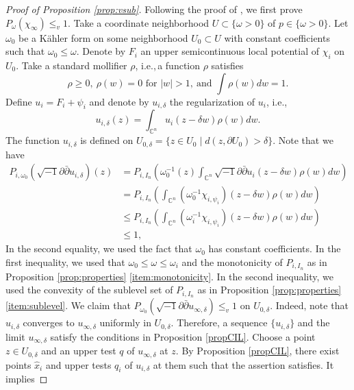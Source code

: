 \documentclass{amsart}
\numberwithin{equation}{section}
\theoremstyle{plain}
\theoremstyle{definition}
\theoremstyle{remark}
\newcommand{\delb}{\sqrt{-1}\partial\bar{\partial}}
\begin{document}
\begin{proof}[Proof of Proposition \ref{prop:vsub}]
    Following the proof of \cite[Proposition 21]{CS17}, we first prove $P_\omega(\chi_\infty)\le_v1$.
    Take a coordinate neighborhood $U\subset\{\omega>0\}$ of $p\in\{\omega>0\}$. Let $\omega_0$ be a K{\"a}hler form on some neighborhood $U_0 \subset U$ with constant coefficients such that $\omega_0 \le \omega$. Denote by $F_i$ an upper semicontinuous local potential of $\chi_i$ on $U_0$. Take a standard mollifier $\rho$, i.e.,\,a function $\rho$ satisfies $$\rho\ge0, \ \rho(w)=0 \text{ for $|w|>1$},\ \text{and } \int\rho(w)dw=1.$$ Define $u_{i}=F_i+\psi_i$ and denote by $u_{i,\delta}$ the regularization of $u_i$, i.e.,
    \begin{equation*}
        u_{i,\delta}(z)=\int_{\mathbb{C}^n} u_i(z-\delta w)\rho(w)dw.
    \end{equation*}
    The function $u_{i,\delta}$ is defined on $U_{0,\delta} =\{z\in U_0\mid d(z,\partial U_0)> \delta \}.$
    Note that we have
    \begin{equation*}
        \begin{split}
        P_{i,\omega_0}(\delb u_{i,\delta})(z)
        &=P_{i,I_n}\left(\omega^{-1}_0(z) \int_{\mathbb{C}^n}\delb u_i(z-\delta w)\rho(w)dw
        \right)\\
        &=P_{i,I_n}\left( \int_{\mathbb{C}^n}(\omega^{-1}_0 \chi_{i,\psi_i})(z-\delta w)\rho(w)dw
        \right)\\
        &\le P_{i,I_n}\left( \int_{\mathbb{C}^n}(\omega^{-1}_i \chi_{i,\psi_i})(z-\delta w)\rho(w)dw
        \right)\\
        &\le 1,
        \end{split}
    \end{equation*}
    In the second equality, we used the fact that $\omega_0$ has constant coefficients. In the first inequality, we used that $\omega_0\le \omega\le\omega_i$ and the monotonicity of $P_{i,I_n}$ as in Proposition \ref{prop:properties} \ref{item:monotonicity}. In the second inequality, we used the convexity of the sublevel set of $P_{i,I_n}$ as in Proposition \ref{prop:properties} \ref{item:sublevel}. We claim that $P_{\omega_0}(\delb u_{\infty,\delta})\le_v 1$ on $U_{0,\delta}$.
    Indeed, note that $u_{i,\delta}$ converges to $u_{\infty,\delta}$ uniformly in $U_{0,\delta}$. Therefore, a sequence $\{ u_{i,\delta}\}$ and the limit $u_{\infty,\delta}$ satisfy the conditions in Proposition \ref{propCIL}. Choose a point $z \in U_{0,\delta}$ and an upper test $q$ of $u_{\infty,\delta}$ at $z$. By Proposition \ref{propCIL}, there exist points $\hat{x}_i$ and upper tests $q_i$ of $u_{i,\delta}$ at them such that the assertion satisfies. It implies 

\end{proof}
\end{document}
